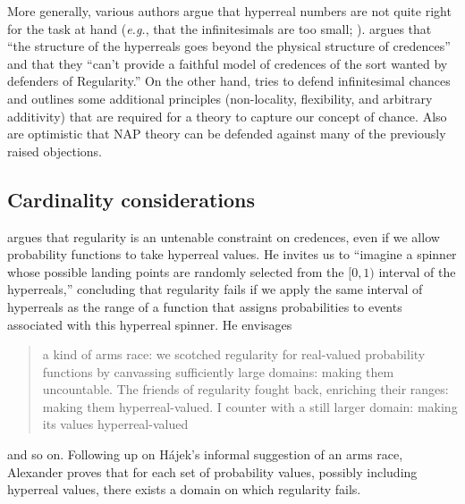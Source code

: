 More generally, various authors argue that hyperreal numbers are not quite right for the task at hand (\textit{e.g.}, that the infinitesimals are too small; \citealp{Easwaran:2014,Pruss:2014}). \citet[pp.~34--35]{Easwaran:2014} argues that ``the structure of the hyperreals goes beyond the physical structure of credences'' and that they ``can't provide a faithful model of credences of the sort wanted by defenders of Regularity.''
On the other hand, \citet{Hofweber:2014} tries to defend infinitesimal chances and outlines some additional principles (non-locality, flexibility, and arbitrary additivity) that are required for a theory to capture our concept of chance. Also \citet{Benci_etal:2018} are optimistic that NAP theory can be defended against many of the previously raised objections.

\subsection{Cardinality considerations}
\citet{Hajek:2012b} argues that regularity is an untenable constraint on credences, even if we allow probability functions to take hyperreal values. He invites us to ``imagine a spinner whose possible landing points are randomly selected from the $[0, 1)$ interval of the hyperreals,'' concluding that regularity fails if we apply the same interval of hyperreals as the range of a function that assigns probabilities to events associated with this hyperreal spinner.
He envisages
\begin{quote}
a kind of arms race: we scotched regularity for real-valued probability functions by canvassing sufficiently large domains: making them uncountable. The friends of regularity fought back, enriching their ranges: making them hyperreal-valued. I counter with a still larger domain: making its values hyperreal-valued
\end{quote}
and so on. Following up on H{\'a}jek's informal suggestion of an arms race, Alexander \citet{Pruss:2013} proves that for each set of probability values, possibly including hyperreal values, there exists a domain on which regularity fails.

